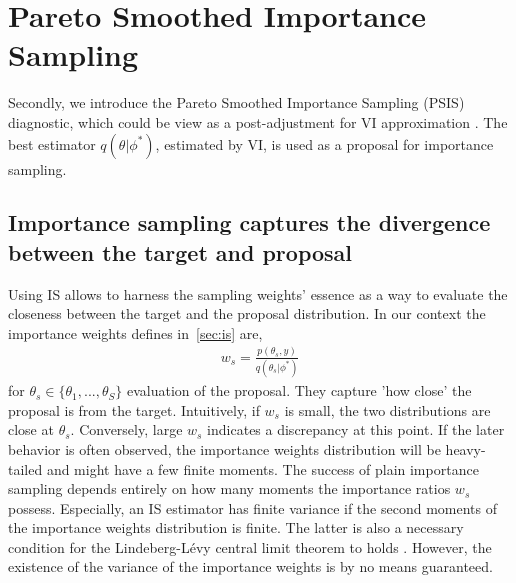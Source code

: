 \documentclass[twoside]{article}
\begin{document}
\section{Pareto Smoothed Importance Sampling}
Secondly, we introduce the Pareto Smoothed Importance Sampling (PSIS) diagnostic, which could be view as a post-adjustment for VI approximation \citep{2018arXiv180202538Y}. The best estimator $q(\theta | \phi^*)$, estimated by VI, is used as a proposal for importance sampling.

\subsection{Importance sampling captures the divergence between the target and proposal}
Using IS allows to harness the sampling weights' essence as a way to evaluate the closeness between the target and the proposal distribution. In our context the importance weights defines in~\ref{sec:is} are,
\begin{align} \label{eq:importance_weights}
    w_s = \frac{p(\theta_s,y)} {q(\theta_s | \phi^*)}
\end{align}
for $\theta_s \in \{\theta_1, ..., \theta_S\}$ evaluation of the proposal. They capture 'how close' the proposal is from the target. Intuitively, if $w_s$ is small, the two distributions are close at $\theta_s$. Conversely, large $w_s$ indicates a discrepancy at this point. If the later behavior is often observed, the importance weights distribution will be heavy-tailed and might have a few finite moments. The success of plain importance sampling depends entirely on how many moments the importance ratios $w_s$ possess. Especially, an IS estimator has finite variance if the second moments of the importance weights distribution is finite. The latter is also a necessary condition for the Lindeberg-Lévy central limit theorem to holds \citep{Koopman:2009aa}. However, the existence of the variance of the importance weights is by no means guaranteed. 
\end{document}

